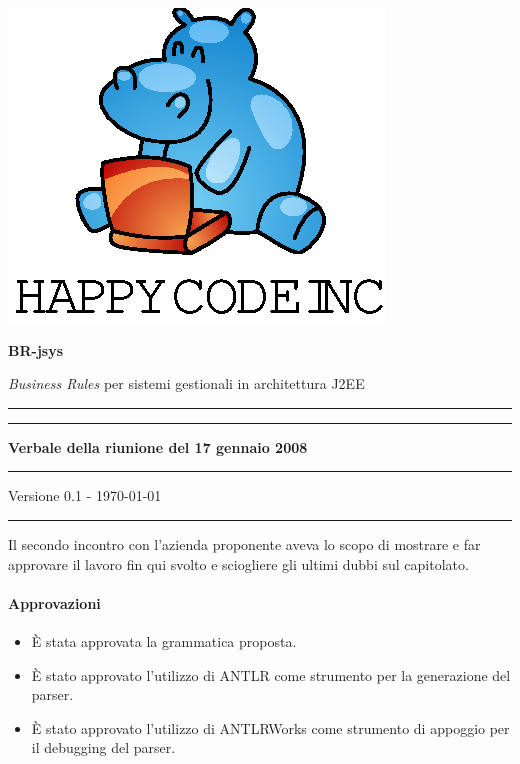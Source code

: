 \documentclass[11pt,titlepage,a4paper]{report}
\begin{document}
\begin{titlepage}
\begin{center}
\vspace*{0.5in}
\includegraphics{logo.eps}
\vspace*{0.2in}

{\Large \textbf{BR-jsys}}

{\Large \emph{Business Rules} per sistemi gestionali in architettura J2EE } 
\vspace{1.3in}
\par\rule{10cm}{.4pt} \par
\par\rule{12cm}{1pt} \par
\vspace*{0.5in}
\LARGE \textbf {Verbale della riunione del 17 gennaio 2008}
\vspace*{0.5in}
\par\rule{12cm}{1pt} \par
{\large Versione 0.1 - \today}
\par\rule{10cm}{.4pt} \par

\end{center}
\end{titlepage}
\vspace*{0.5in}

\thispagestyle{plain}
Il secondo incontro con l'azienda proponente aveva lo scopo di mostrare e far approvare il lavoro fin qui svolto e sciogliere gli ultimi dubbi sul capitolato.

\paragraph{Approvazioni}
\begin{itemize}

\item \`E stata approvata la grammatica proposta.
\item \`E stato approvato l'utilizzo di ANTLR come strumento per la generazione del parser.
\item \`E stato approvato l'utilizzo di ANTLRWorks come strumento di appoggio per il debugging del parser.

\end{itemize}
\end{document}
